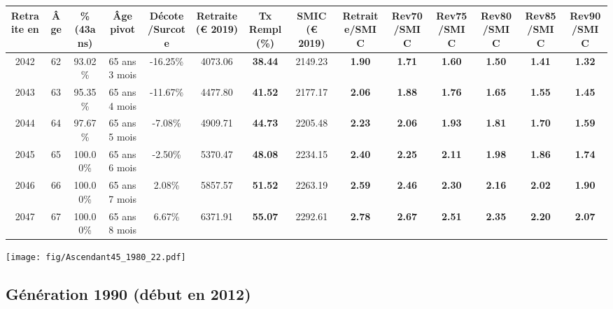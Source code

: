 \begin{adjustbox}{max width=\textwidth} 
\begin{tabular}[htb]{|c|c||c|c|c||c|c||c||c|c|c|c|c|c|} 
\hline 
 Retraite en &  Âge &  \%(43ans) &  Âge pivot &  Décote/Surcote &  Retraite (\euro{} 2019) &  Tx Rempl(\%) &  SMIC (\euro{} 2019) &  Retraite/SMIC &  Rev70/SMIC &  Rev75/SMIC &  Rev80/SMIC &  Rev85/SMIC &  Rev90/SMIC \\ 
\hline \hline 
 2042 &  62 &  93.02\% &  65 ans 3 mois &  -16.25\% &  4073.06 &  {\bf 38.44} &  2149.23 &  {\bf 1.90} &  {\bf 1.71} &  {\bf 1.60} &  {\bf 1.50} &  {\bf 1.41} &  {\bf 1.32} \\ 
\hline 
 2043 &  63 &  95.35\% &  65 ans 4 mois &  -11.67\% &  4477.80 &  {\bf 41.52} &  2177.17 &  {\bf 2.06} &  {\bf 1.88} &  {\bf 1.76} &  {\bf 1.65} &  {\bf 1.55} &  {\bf 1.45} \\ 
\hline 
 2044 &  64 &  97.67\% &  65 ans 5 mois &  -7.08\% &  4909.71 &  {\bf 44.73} &  2205.48 &  {\bf 2.23} &  {\bf 2.06} &  {\bf 1.93} &  {\bf 1.81} &  {\bf 1.70} &  {\bf 1.59} \\ 
\hline 
 2045 &  65 &  100.00\% &  65 ans 6 mois &  -2.50\% &  5370.47 &  {\bf 48.08} &  2234.15 &  {\bf 2.40} &  {\bf 2.25} &  {\bf 2.11} &  {\bf 1.98} &  {\bf 1.86} &  {\bf 1.74} \\ 
\hline 
 2046 &  66 &  100.00\% &  65 ans 7 mois &  2.08\% &  5857.57 &  {\bf 51.52} &  2263.19 &  {\bf 2.59} &  {\bf 2.46} &  {\bf 2.30} &  {\bf 2.16} &  {\bf 2.02} &  {\bf 1.90} \\ 
\hline 
 2047 &  67 &  100.00\% &  65 ans 8 mois &  6.67\% &  6371.91 &  {\bf 55.07} &  2292.61 &  {\bf 2.78} &  {\bf 2.67} &  {\bf 2.51} &  {\bf 2.35} &  {\bf 2.20} &  {\bf 2.07} \\ 
\hline 
\hline 
\end{tabular} 
\end{adjustbox} 
 
 \vspace{0.1cm} 

 \begin{center}\texttt{[image: fig/Ascendant45\_1980\_22.pdf]}\end{center} \label{fig/Ascendant45_1980_22.pdf} 

\newpage 
 
\subsection{Génération 1990 (début en 2012)} 

